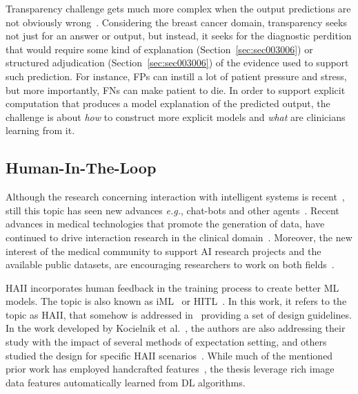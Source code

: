 Transparency challenge gets much more complex when the output predictions are not obviously wrong~\cite{holzinger2018current}.
Considering the breast cancer domain, transparency seeks not just for an answer or output, but instead, it seeks for the diagnostic perdition that would require some kind of explanation (Section~\ref{sec:sec003006}) or structured adjudication (Section~\ref{sec:sec003006}) of the evidence used to support such prediction.
For instance, \acp{FP} can instill a lot of patient pressure and stress, but more importantly, \acp{FN} can make patient to die.
In order to support explicit computation that produces a model explanation of the predicted output, the challenge is about {\it how} to construct more explicit models and {\it what} are clinicians learning from it.

\subsection{Human-In-The-Loop}
\label{sec:sec006002002}

Although the research concerning interaction with intelligent systems is recent~\cite{burr2018analysis, johnson2016face}, still this topic has seen new advances {\it e.g.}, chat-bots and other agents~\cite{chattopadhyay2017evaluating, miller2019intrinsically, mou2017media}.
Recent advances in medical technologies that promote the generation of data, have continued to drive interaction research in the clinical domain~\cite{azuaje2019artificial, chin2018clinical}.
Moreover, the new interest of the medical community to support \ac{AI} research projects and the available public datasets, are encouraging researchers to work on both fields~\cite{lau2018dataset, price2018big}.

\ac{HAII} incorporates human feedback in the training process to create better \ac{ML} models.
The topic is also known as \ac{iML}~\cite{fails2003interactive} or \ac{HITL}~\cite{holzinger2016interactive}.
In this work, it refers to the topic as \ac{HAII}, that somehow is addressed in~\cite{10.1145/3290605.3300233} providing a set of design guidelines.
In the work developed by Kocielnik et al.~\cite{Kocielnik:2019:YAI:3290605.3300641}, the authors are also addressing their study with the impact of several methods of expectation setting, and others studied the design for specific \ac{HAII} scenarios~\cite{aha2017ai}.
While much of the mentioned prior work has employed handcrafted features~\cite{10.1145/3290605.3300233, Kocielnik:2019:YAI:3290605.3300641}, the thesis leverage rich image data features automatically learned from \ac{DL} algorithms.

